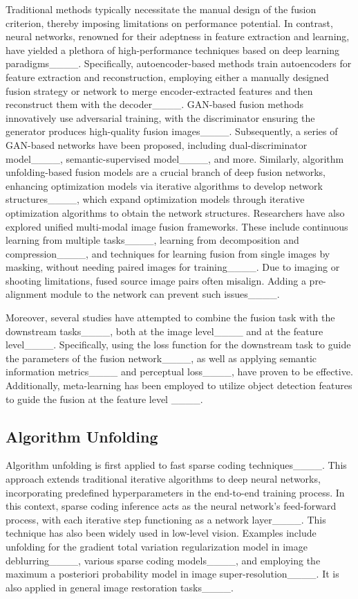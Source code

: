 Traditional methods typically necessitate the manual design of the fusion criterion, thereby imposing limitations on performance potential. 
In contrast, neural networks, renowned for their adeptness in feature extraction and learning, have yielded a plethora of high-performance techniques based on deep learning paradigms____.
Specifically, autoencoder-based methods train autoencoders for feature extraction and reconstruction, employing either a manually designed fusion strategy or network to merge encoder-extracted features and then reconstruct them with the decoder____.
GAN-based fusion methods innovatively use adversarial training, with the discriminator ensuring the generator produces high-quality fusion images____. Subsequently, a series of GAN-based networks have been proposed, including dual-discriminator model____, semantic-supervised model____, and more.
Similarly, algorithm unfolding-based fusion models are a crucial branch of deep fusion networks, enhancing optimization models via iterative algorithms to develop network structures____, which expand optimization models through iterative optimization algorithms to obtain the network structures.
Researchers have also explored unified multi-modal image fusion frameworks. These include continuous learning from multiple tasks____, learning from decomposition and compression____, and techniques for learning fusion from single images by masking, without needing paired images for training____.
Due to imaging or shooting limitations, fused source image pairs often misalign. Adding a pre-alignment module to the network can prevent such issues____.

Moreover, several studies have attempted to combine the fusion task with the downstream tasks____, both at the image level____ and at the feature level____. 
Specifically, using the loss function for the downstream task to guide the parameters of the fusion network____, as well as applying semantic information metrics____ and perceptual loss____, have proven to be effective.
Additionally, meta-learning has been employed to utilize object detection features to guide the fusion at the feature level ____.

\subsection{Algorithm Unfolding}

Algorithm unfolding is first applied to fast sparse coding techniques____. This approach extends traditional iterative algorithms to deep neural networks, incorporating predefined hyperparameters in the end-to-end training process.
In this context, sparse coding inference acts as the neural network's feed-forward process, with each iterative step functioning as a network layer____.
This technique has also been widely used in low-level vision. Examples include unfolding for the gradient total variation regularization model in image deblurring____, various sparse coding models____, and employing the maximum a posteriori probability model in image super-resolution____. It is also applied in general image restoration tasks____.

